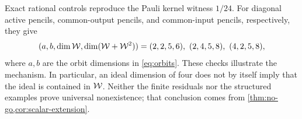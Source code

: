 Exact rational controls reproduce the Pauli kernel witness $1/24$.
For diagonal active pencils, common-output pencils, and common-input
pencils, respectively, they give
\begin{align}
	(a,b,\dim\mathcal{W},\dim(\mathcal{W}+\mathcal{W}^2))
	=(2,2,5,6),\ (2,4,5,8),\ (4,2,5,8),
\end{align}
where $a,b$ are the orbit dimensions in \cref{eq:orbits}.
These checks illustrate the mechanism. In particular, an ideal dimension
of four does not by itself imply that the ideal is contained in $\mathcal{W}$.
Neither the finite residuals nor the structured examples prove universal
nonexistence; that conclusion comes from \cref{thm:no-go,cor:scalar-extension}.
